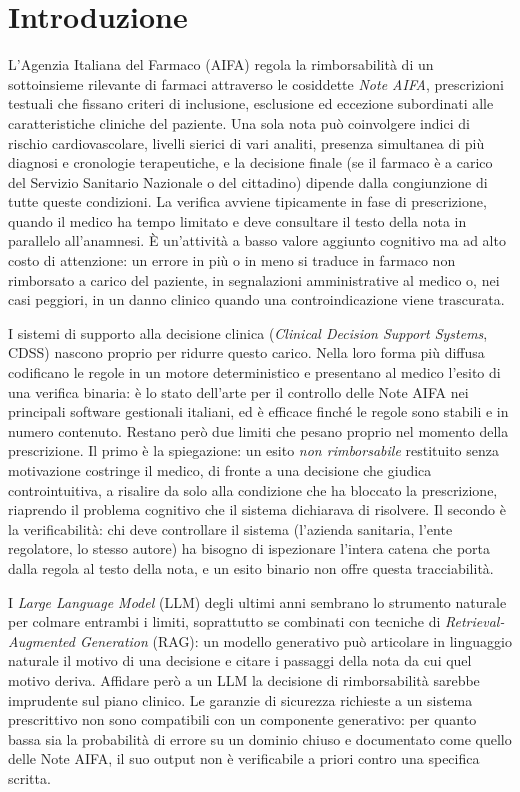 \chapter*{Introduzione}

L'Agenzia Italiana del Farmaco (AIFA) regola la rimborsabilità di un sottoinsieme rilevante di farmaci attraverso le cosiddette \emph{Note AIFA}, prescrizioni testuali che fissano criteri di inclusione, esclusione ed eccezione subordinati alle caratteristiche cliniche del paziente. Una sola nota può coinvolgere indici di rischio cardiovascolare, livelli sierici di vari analiti, presenza simultanea di più diagnosi e cronologie terapeutiche, e la decisione finale (se il farmaco è a carico del Servizio Sanitario Nazionale o del cittadino) dipende dalla congiunzione di tutte queste condizioni. La verifica avviene tipicamente in fase di prescrizione, quando il medico ha tempo limitato e deve consultare il testo della nota in parallelo all'anamnesi. È un'attività a basso valore aggiunto cognitivo ma ad alto costo di attenzione: un errore in più o in meno si traduce in farmaco non rimborsato a carico del paziente, in segnalazioni amministrative al medico o, nei casi peggiori, in un danno clinico quando una controindicazione viene trascurata.

I sistemi di supporto alla decisione clinica (\emph{Clinical Decision Support Systems}, CDSS) nascono proprio per ridurre questo carico. Nella loro forma più diffusa codificano le regole in un motore deterministico e presentano al medico l'esito di una verifica binaria: è lo stato dell'arte per il controllo delle Note AIFA nei principali software gestionali italiani, ed è efficace finché le regole sono stabili e in numero contenuto. Restano però due limiti che pesano proprio nel momento della prescrizione. Il primo è la spiegazione: un esito \emph{non rimborsabile} restituito senza motivazione costringe il medico, di fronte a una decisione che giudica controintuitiva, a risalire da solo alla condizione che ha bloccato la prescrizione, riaprendo il problema cognitivo che il sistema dichiarava di risolvere. Il secondo è la verificabilità: chi deve controllare il sistema (l'azienda sanitaria, l'ente regolatore, lo stesso autore) ha bisogno di ispezionare l'intera catena che porta dalla regola al testo della nota, e un esito binario non offre questa tracciabilità.

I \emph{Large Language Model} (LLM) degli ultimi anni sembrano lo strumento naturale per colmare entrambi i limiti, soprattutto se combinati con tecniche di \emph{Retrieval-Augmented Generation} (RAG): un modello generativo può articolare in linguaggio naturale il motivo di una decisione e citare i passaggi della nota da cui quel motivo deriva. Affidare però a un LLM la decisione di rimborsabilità sarebbe imprudente sul piano clinico. Le garanzie di sicurezza richieste a un sistema prescrittivo non sono compatibili con un componente generativo: per quanto bassa sia la probabilità di errore su un dominio chiuso e documentato come quello delle Note AIFA, il suo output non è verificabile a priori contro una specifica scritta.

